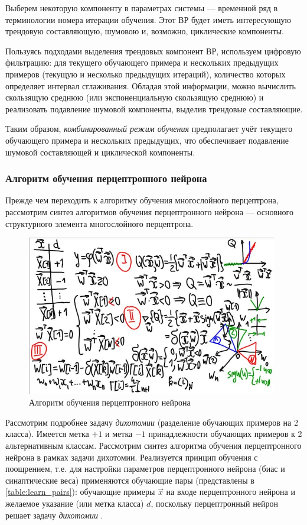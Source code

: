 \documentclass{article}
\numberwithin{equation}{subsection}
\begin{document}
Выберем некоторую компоненту в параметрах системы --- временной ряд в терминологии
номера итерации обучения. Этот ВР будет иметь интересующую трендовую составляющую,
шумовою и, возможно, циклические компоненты.

Пользуясь подходами выделения трендовых компонент ВР, используем цифровую фильтрацию:
для текущего обучающего примера и нескольких предыдущих примеров (текущую и несколько
предыдущих итераций), количество которых определяет интервал сглаживания.
Обладая этой информации, можно вычислить скользящую среднюю (или экспоненциальную 
скользящую среднюю) и реализовать подавление шумовой компоненты, выделив 
трендовые составляющие.

Таким образом, \textit{комбинированный режим обучения} предполагает учёт текущего
обучающего примера и нескольких предыдущих, что обеспечивает подавление шумовой 
составляющей и циклической компоненты.




\subsubsection{Алгоритм обучения перцептронного нейрона}

Прежде чем переходить к алгоритму обучения многослойного перцептрона, рассмотрим
синтез алгоритмов обучения перцептронного нейрона --- основного структурного
элемента многослойного перцептрона.

\begin{figure}[htbp]
    \centering
    \includegraphics[height=7cm]{hyperflat_6_1.jpeg}
    \caption{Алгоритм обучения перцептронного нейрона}
    \label{hyperflat_6_1}
\end{figure}

Рассмотрим подробнее задачу \textit{дихотомии} (разделение обучающих примеров 
на 2 класса). Имеется метка $+1$ и метка $-1$ принадлежности обучающих примеров 
к 2 альтернативным классам. Рассмотрим синтез алгоритма обучения перцептронного 
нейрона в рамках задачи дихотомии. Реализуется принцип обучения с поощрением, т.е.
для настройки параметров перцептронного нейрона (биас и синаптические веса) 
применяются обучающие пары (представлены в \ref{table:learn_pairs}): обучающие примеры
$\vec{x}$ на входе перцептронного нейрона и желаемое указание (или метка класса) $d$,
поскольку перцептронный нейрон решает задачу \textit{дихотомии} .
\end{document}
